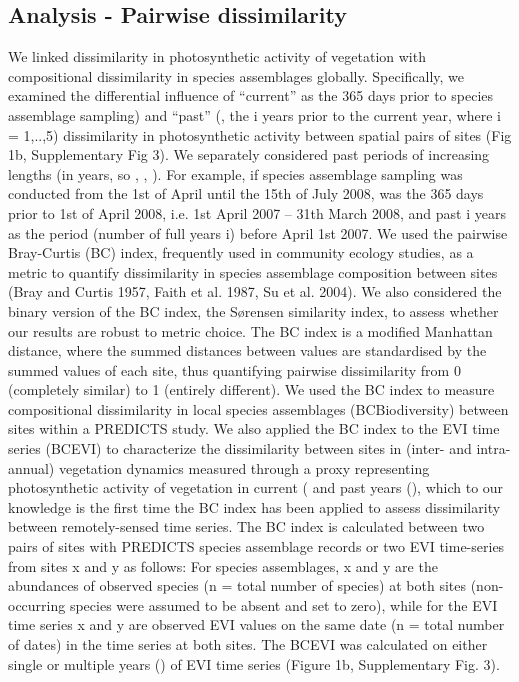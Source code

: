 \subsection{Analysis - Pairwise dissimilarity}
We linked dissimilarity in photosynthetic activity of vegetation with compositional dissimilarity in species assemblages globally. Specifically, we examined the differential influence of “current”  as the 365 days prior to species assemblage sampling) and “past” (, the i years prior to the current year, where i = 1,..,5) dissimilarity in photosynthetic activity between spatial pairs of sites (Fig 1b, Supplementary Fig 3). We separately considered past periods of increasing lengths (in years, so , , ). For example, if species assemblage sampling was conducted from the 1st of April until the 15th of July 2008,  was the 365 days prior to 1st of April 2008, i.e. 1st April 2007 – 31th March 2008, and past i years as the period (number of full years i) before April 1st 2007.
	We used the pairwise Bray-Curtis (BC) index, frequently used in community ecology studies, as a metric to quantify dissimilarity in species assemblage composition between sites (Bray and Curtis 1957, Faith et al. 1987, Su et al. 2004). We also considered the binary version of the BC index, the Sørensen similarity index, to assess whether our results are robust to metric choice. The BC index is a modified Manhattan distance, where the summed distances between values are standardised by the summed values of each site, thus quantifying pairwise dissimilarity from 0 (completely similar) to 1 (entirely different). We used the BC index to measure compositional dissimilarity in local species assemblages (BCBiodiversity) between sites within a PREDICTS study. We also applied the BC index to the EVI time series (BCEVI) to characterize the dissimilarity between sites in (inter- and intra-annual) vegetation dynamics measured through a proxy representing photosynthetic activity of vegetation in current ( and past years (), which to our knowledge is the first time the BC index has been applied to assess dissimilarity between remotely-sensed time series.
	The BC index is calculated between two pairs of sites with PREDICTS species assemblage records or two EVI time-series from sites x and y as follows: 
For species assemblages, x and y are the abundances of observed species (n = total number of species) at both sites (non-occurring species were assumed to be absent and set to zero), while for the EVI time series x and y are observed EVI values on the same date (n = total number of dates) in the time series at both sites. The BCEVI was calculated on either single or multiple years () of EVI time series (Figure 1b, Supplementary Fig. 3).
